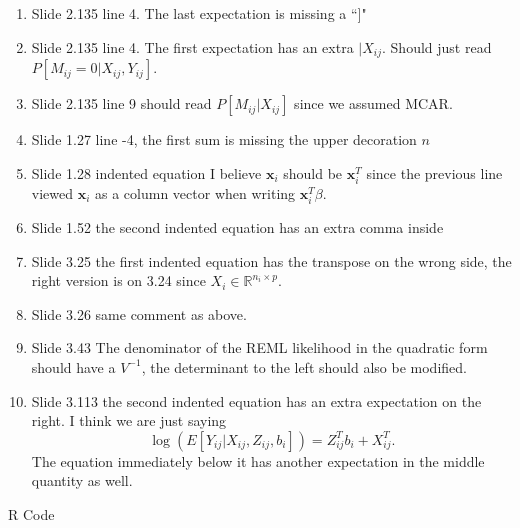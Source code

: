 \documentclass[11pt]{article}
\newcommand{\R}{\mathbb{R}}
\begin{document}
\begin{enumerate}
\begin{enumerate}
			\item Slide 2.135 line 4. The last expectation is missing a ``$]$"
			\item Slide 2.135 line 4. The first expectation has an extra $|X_{ij}$. Should just read $P[M_{ij}=0|X_{ij},Y_{ij}]$.
			\item Slide 2.135 line 9 should read $P[M_{ij}|X_{ij}]$ since we assumed MCAR.
			\item Slide 1.27 line -4, the first sum is missing the upper decoration $n$
			\item Slide 1.28 indented equation I believe $\bm{x}_i$ should be $\bm{x}_i^T$ since the previous line viewed $\bm{x}_i$ as a column vector when writing $\bm{x}_i^T\beta$.
			\item Slide 1.52 the second indented equation has an extra comma inside
			\item Slide 3.25 the first indented equation has the transpose on the wrong side, the right version is on 3.24 since $X_i\in \R^{n_i\times p}$.
			\item Slide 3.26 same comment as above.
			\item Slide 3.43 The denominator of the REML likelihood in the quadratic form should have a $V^{-1}$, the determinant to the left should also be modified.
			\item Slide 3.113 the second indented equation has an extra expectation on the right. I think we are just saying
			\[
				\log(E[Y_{ij}|X_{ij},Z_{ij},b_i]) = Z_{ij}^Tb_i + X_{ij}^T.
			\]
			The equation immediately below it has another expectation in the middle quantity as well.
		\end{enumerate}
\end{enumerate}
\newpage
R Code
\end{document}
